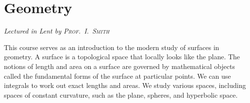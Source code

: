 \chapter[Geometry \\ \textnormal{\emph{Lectured in Lent \oldstylenums{2022} by \textsc{Prof.\ I.\ Smith}}}]{Geometry}
\emph{\Large Lectured in Lent  by \textsc{Prof.\ I.\ Smith}}

This course serves as an introduction to the modern study of surfaces in geometry.
A surface is a topological space that locally looks like the plane.
The notions of length and area on a surface are governed by mathematical objects called the fundamental forms of the surface at particular points.
We can use integrals to work out exact lengths and areas.
We study various spaces, including spaces of constant curvature, such as the plane, spheres, and hyperbolic space.


